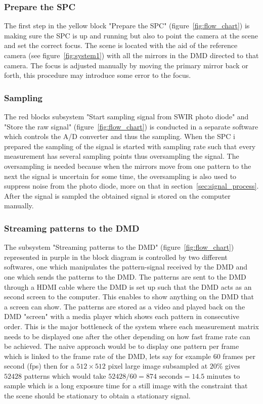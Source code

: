 
\subsubsection{Prepare the SPC}
The first step in the yellow block "Prepare the SPC" (figure~\ref{fig:flow_chart}) is making sure the SPC is up and running but also to point the camera at the scene and set the correct focus. The scene is located with the aid of the reference camera (see figure~\ref{fig:system1}) with all the mirrors in the DMD directed to that camera. The focus is adjusted manually by moving the primary mirror back or forth, this procedure may introduce some error to the focus.\\[0.1in]

\subsubsection{Sampling}
The red blocks subsystem "Start sampling signal from SWIR photo diode" and "Store the raw signal" (figure~\ref{fig:flow_chart}) is conducted in a separate software which controls the A/D converter and thus the sampling. When the SPC i prepared the sampling of the signal is started with sampling rate such that every measurement has several sampling points thus oversampling the signal. The oversampling is needed because when the mirrors move from one pattern to the next the signal is uncertain for some time, the oversampling is also used to suppress noise from the photo diode, more on that in section~\ref{sec:signal_process}. After the signal is sampled the obtained signal is stored on the computer manually.

\subsubsection{Streaming patterns to the DMD}
\label{sec:stream_dmd}
The subsystem "Streaming patterns to the DMD" (figure~\ref{fig:flow_chart}) represented in purple in the block diagram is controlled by two different softwares, one which manipulates the pattern-signal received by the DMD and one which sends the patterns to the DMD. The patterns are sent to the DMD through a HDMI cable where the DMD is set up such that the DMD acts as an second screen to the computer. This enables to show anything on the DMD that a screen can show. The patterns are stored as a video and played back on the DMD "screen" with a media player which shows each pattern in consecutive order. This is the major bottleneck of the system where each measurement matrix needs to be displayed one after the other depending on how fast frame rate can be achieved. The naive approach would be to display one pattern per frame which is linked to the frame rate of the DMD, lets say for example 60 frames per second (fps) then for a $512\times 512$ pixel large image subsampled at $20\%$ gives $52428$ patterns which would take $52428/60 = 874 \text{ seconds} = 14.5 \text{ minutes}$ to sample which is a long exposure time for a still image with the constraint that the scene should be stationary to obtain a stationary signal.\\[0.1in]

